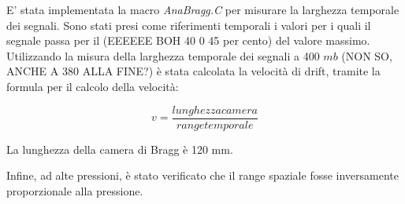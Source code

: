 E' stata implementata la macro \textit{AnaBragg.C} per misurare la larghezza temporale dei segnali. Sono stati presi come riferimenti temporali i valori per i quali il segnale
passa per il (EEEEEE BOH 40 0 45 per cento) del valore massimo. Utilizzando la misura della larghezza temporale dei segnali a 400 $mb$ (NON SO, ANCHE A 380 ALLA FINE?) è stata calcolata la velocità di drift, 
tramite la formula per il calcolo della velocità:

$$ v=\frac{lunghezza camera}{range temporale} $$

La lunghezza della camera di Bragg è 120 mm.

Infine, ad alte pressioni, è stato verificato che il range spaziale fosse inversamente proporzionale alla pressione.
